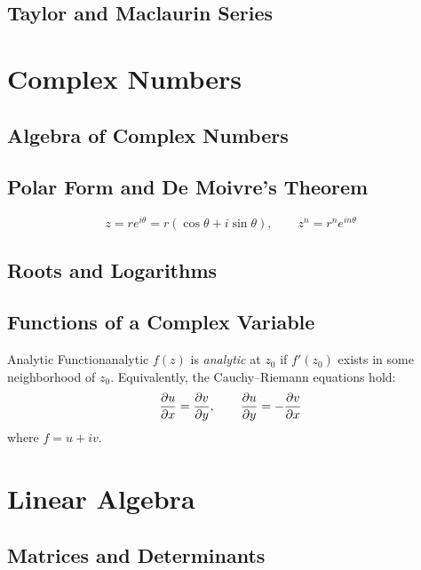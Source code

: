 \documentclass[11pt, letterpaper]{article}
\theoremstyle{plain}
\begin{document}
\subsection{Taylor and Maclaurin Series}



\section{Complex Numbers}                 %

\subsection{Algebra of Complex Numbers}

\subsection{Polar Form and De Moivre's Theorem}
\[
  z = r e^{i\theta} = r(\cos\theta + i\sin\theta), \qquad
  z^n = r^n e^{in\theta}
\]

\subsection{Roots and Logarithms}

\subsection{Functions of a Complex Variable}

\begin{definition}{Analytic Function}{analytic}
  $f(z)$ is \emph{analytic} at $z_0$ if $f'(z_0)$ exists in some
  neighborhood of $z_0$.  Equivalently, the Cauchy–Riemann equations hold:
  \[
    \pdv{u}{x} = \pdv{v}{y}, \qquad \pdv{u}{y} = -\pdv{v}{x}
  \]
  where $f = u + iv$.
\end{definition}


\section{Linear Algebra}                  %

\subsection{Matrices and Determinants}
\end{document}

